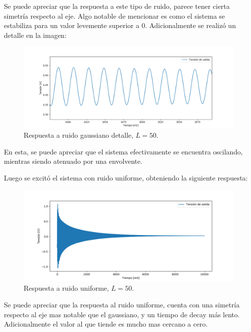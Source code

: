 Se puede apreciar que la respuesta a este tipo de ruido, parece tener cierta simetría respecto al eje. Algo notable de mencionar es como el sistema se estabiliza para un valor levemente superior a 0. Adicionalmente se realizó un detalle en la imagen:
\begin{figure}[H]
	\centering
	\includegraphics[width=\textwidth]{ImagenesEjercicio4/gaussianResponseDETAIL.PNG}
	\caption{Respuesta a ruido gaussiano detalle, $L=50$.}
	\label{fig:gaussianod}
\end{figure}

En esta, se puede apreciar que el sistema efectivamente se encuentra oscilando, mientras siendo atenuado por una envolvente.

Luego se excitó el sistema con ruido uniforme, obteniendo la siguiente respuesta:
\begin{figure}[H]
	\centering
	\includegraphics[width=\textwidth]{ImagenesEjercicio4/uniformResponse.PNG}
\caption{Respuesta a ruido uniforme, $L=50$.}
	\label{fig:uniforme}
\end{figure}

Se puede apreciar que la respuesta al ruido uniforme, cuenta con una simetría respecto al eje mas notable que el gaussiano, y un tiempo de decay más lento. Adicionalmente el valor al que tiende es mucho mas cercano a cero.


